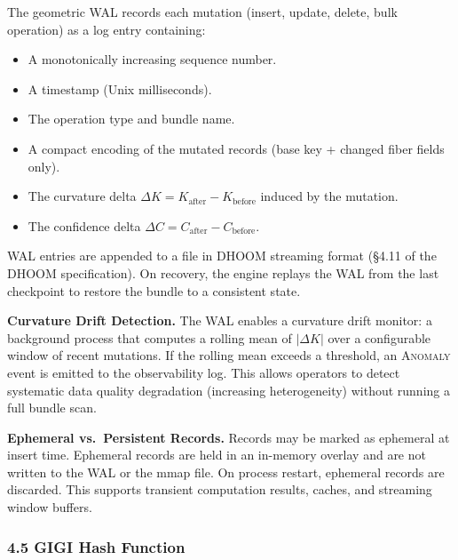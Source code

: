 \documentclass[11pt,letterpaper]{article}
\begin{document}
The geometric WAL records each mutation (insert, update, delete, bulk operation) as a log entry containing:
\begin{itemize}[nosep]
  \item A monotonically increasing sequence number.
  \item A timestamp (Unix milliseconds).
  \item The operation type and bundle name.
  \item A compact encoding of the mutated records (base key + changed fiber fields only).
  \item The curvature delta $\Delta K = K_{\mathrm{after}} - K_{\mathrm{before}}$ induced by the mutation.
  \item The confidence delta $\Delta C = C_{\mathrm{after}} - C_{\mathrm{before}}$.
\end{itemize}

WAL entries are appended to a file in DHOOM streaming format (\S4.11 of the DHOOM specification). On recovery, the engine replays the WAL from the last checkpoint to restore the bundle to a consistent state.

\textbf{Curvature Drift Detection.} The WAL enables a curvature drift monitor: a background process that computes a rolling mean of $|\Delta K|$ over a configurable window of recent mutations. If the rolling mean exceeds a threshold, an \textsc{Anomaly} event is emitted to the observability log. This allows operators to detect systematic data quality degradation (increasing heterogeneity) without running a full bundle scan.

\textbf{Ephemeral vs.\ Persistent Records.} Records may be marked as ephemeral at insert time. Ephemeral records are held in an in-memory overlay and are not written to the WAL or the mmap file. On process restart, ephemeral records are discarded. This supports transient computation results, caches, and streaming window buffers.


\subsubsection*{4.5 GIGI Hash Function}
\end{document}
